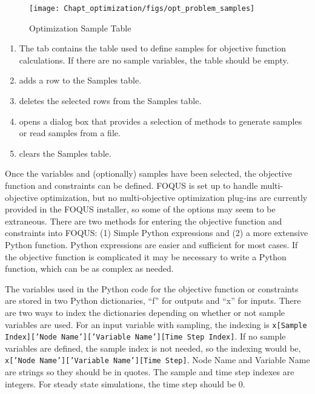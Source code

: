 \begin{figure}[H]
	\begin{center}
		\texttt{[image: Chapt\_optimization/figs/opt\_problem\_samples]}
		\caption{Optimization Sample Table}
		\label{fig.opt.problem.samples}
	\end{center}
\end{figure}

\begin{enumerate}
	\item The  tab contains the table used to define samples for objective function calculations. If there are no sample variables, the table should be empty.
	\item {} adds a row to the Samples table.
	\item {} deletes the selected rows from the Samples table.
	\item {} opens a dialog box that provides a selection of methods to generate samples or read samples from a file.
	\item {} clears the Samples table.
\end{enumerate}

Once the variables and (optionally) samples have been selected, the objective function and constraints can be defined. FOQUS is set up to handle multi-objective optimization, but no multi-objective optimization plug-ins are currently provided in the FOQUS installer, so some of the options may seem to be extraneous. There are two methods for entering the objective function and constraints into FOQUS: (1) Simple Python expressions and (2) a more extensive Python function. Python expressions are easier and sufficient for most cases. If the objective function is complicated it may be necessary to write a Python function, which can be as complex as needed.

The variables used in the Python code for the objective function or constraints are stored in two Python dictionaries, ``f'' for outputs and ``x'' for inputs. There are two ways to index the dictionaries depending on whether or not sample variables are used. For an input variable with sampling, the indexing is \texttt{x[Sample Index]['Node Name']['Variable Name'][Time Step Index]}. If no sample variables are defined, the sample index is not needed, so the indexing would be, \texttt{x['Node Name']['Variable Name'][Time Step]}.  Node Name and Variable Name are strings so they should be in quotes. The sample and time step indexes are integers. For steady state simulations, the time step should be 0.

